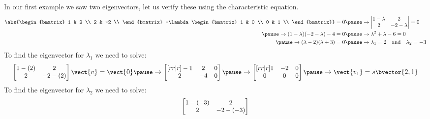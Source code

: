 \documentclass{beamer}
\begin{document}
\begin{frame}
\begin{example}
In our first example we saw two eigenvectors, let us verify these using the characteristic equation.
\begin{equation*}
\begin{aligned}
\abs{\begin{bmatrix}
1 & 2 \\
2 & -2 \\
\end{bmatrix}
-\lambda
\begin{bmatrix}
1 & 0 \\
0 & 1 \\
\end{bmatrix}}=0\pause
&\rightarrow
\begin{vmatrix}
1-\lambda & 2 \\
2 & -2-\lambda \\
\end{vmatrix}=0\\\pause
\rightarrow
(1-\lambda)(-2-\lambda)-4=0\pause
&\rightarrow
\lambda^2+\lambda-6=0\\\pause
\rightarrow
(\lambda-2)(\lambda+3)=0\pause
&\rightarrow
\lambda_1=2\quad\text{and}\quad\lambda_2=-3
\end{aligned}
\end{equation*}\pause
To find the eigenvector for $\lambda_1$ we need to solve:
\begin{equation*}\small
\begin{bmatrix}
1-(2) & 2 \\
2 & -2-(2) \\
\end{bmatrix}\vect{v}=\vect{0}\pause
\rightarrow
\begin{bmatrix}[rr|r]
-1 & 2 & 0 \\
2 & -4 & 0 \\
\end{bmatrix}\pause
\rightarrow
\begin{bmatrix}[rr|r]
1 & -2 & 0 \\
0 & 0 & 0 \\
\end{bmatrix}\pause
\rightarrow
\vect{v_1}=s\bvector{2,1}
\end{equation*}\pause
To find the eigenvector for $\lambda_2$ we need to solve:
\begin{equation*}\small
\begin{bmatrix}
1-(-3) & 2 \\
2 & -2-(-3) \\

\end{bmatrix}
\end{equation*}
\end{example}
\end{frame}
\end{document}
